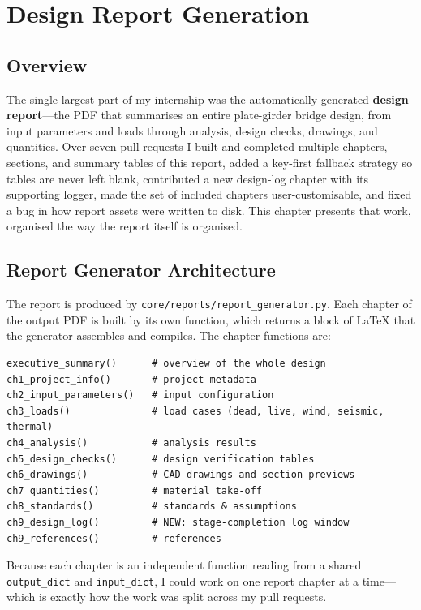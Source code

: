 \chapter{Design Report Generation}
\label{ch:report}

\section{Overview}
The single largest part of my internship was the automatically generated \textbf{design
report}---the PDF that summarises an entire plate-girder bridge design, from input parameters
and loads through analysis, design checks, drawings, and quantities. Over seven pull requests I
built and completed multiple chapters, sections, and summary tables of this report, added a
key-first fallback strategy so tables are never left blank, contributed a new design-log
chapter with its supporting logger, made the set of included chapters user-customisable, and
fixed a bug in how report assets were written to disk. This chapter presents that work,
organised the way the report itself is organised.

\section{Report Generator Architecture}
The report is produced by \texttt{core/reports/report\_generator.py}. Each chapter of the
output PDF is built by its own function, which returns a block of LaTeX that the generator
assembles and compiles. The chapter functions are:

\begin{lstlisting}[caption={Per-chapter functions in the report generator (\texttt{report\_generator.py}).},label={lst:reportfns}]
executive_summary()      # overview of the whole design
ch1_project_info()       # project metadata
ch2_input_parameters()   # input configuration
ch3_loads()              # load cases (dead, live, wind, seismic, thermal)
ch4_analysis()           # analysis results
ch5_design_checks()      # design verification tables
ch6_drawings()           # CAD drawings and section previews
ch7_quantities()         # material take-off
ch8_standards()          # standards & assumptions
ch9_design_log()         # NEW: stage-completion log window
ch9_references()         # references
\end{lstlisting}

Because each chapter is an independent function reading from a shared \texttt{output\_dict} and
\texttt{input\_dict}, I could work on one report chapter at a time---which is exactly how the
work was split across my pull requests.

